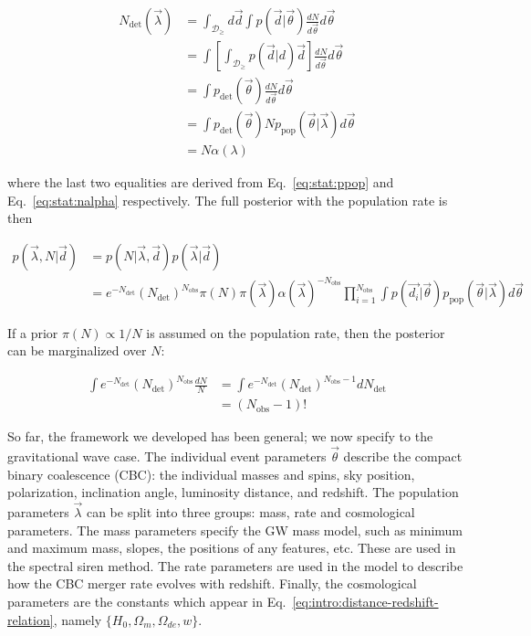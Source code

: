 \documentclass[%
preprint,
 amsmath,amssymb,
 aps,
]{revtex4-2}
\newcommand{\given}[2]{p( #1 | #2 )}
\newcommand{\ppop}[0]{p_{\text{pop}}}
\newcommand{\pdet}[0]{p_{\text{det}}}
\newcommand{\ndet}[0]{N_{\text{det}}}
\newcommand{\nobs}[0]{N_{\text{obs}}}
\begin{document}
\begin{align}
	\ndet(\vec{\lambda}) & = \int_{\mathcal{D}_\geq}  d\vec{d} \int \given{\vec{d}}{\vec{\theta}} \frac{dN}{d\vec{\theta}} d\vec{\theta} \\
	                     & = \int \left[ \int_{\mathcal{D}_\geq} \given{\vec{d}} d\vec{d} \right]\frac{dN}{d\vec{\theta}} d\vec{\theta}  \\
	                     & = \int \pdet(\vec{\theta})\frac{dN}{d\vec{\theta}} d\vec{\theta}                                              \\
	                     & = \int \pdet(\vec{\theta}) N \ppop(\vec{\theta} | \vec{\lambda}) d\vec{\theta}                                \\
	                     & = N \alpha(\lambda)
\end{align}

where the last two equalities are derived from Eq.~\eqref{eq:stat:ppop} and
Eq.~\eqref{eq:stat:nalpha} respectively. The full posterior with the population rate is then

\begin{align}
	\given{\vec{\lambda}, N }{\vec{d}} & = \given{N}{\vec{\lambda}, \vec{d}}\given{\vec{\lambda}}{\vec{d}}                    \\
	                                   & = e^{-\ndet}(\ndet)^{\nobs} \pi(N) \pi(\vec{\lambda}) \alpha(\vec{\lambda})^{-\nobs}
	\prod_{i=1}^{\nobs} \int \given{\vec{d_i}}{\vec{\theta}} \ppop(\vec{\theta} | \vec{\lambda} ) d\vec{\theta}
\end{align}

If a prior $\pi(N) \propto 1/N$ is assumed on the population rate, then the posterior can be
marginalized over $N$:

\begin{align}
	\int e^{-\ndet}(\ndet)^{\nobs} \frac{dN}{N} & = \int e^{-\ndet}(\ndet)^{\nobs - 1} d\ndet \\
	                                            & = (\nobs - 1)!
\end{align}

So far, the framework we developed has been general; we now specify to the gravitational wave case.
The individual event parameters $\vec{\theta}$ describe the compact binary coalescence (CBC): the
individual masses and spins, sky position, polarization, inclination angle, luminosity distance,
and redshift. The population parameters $\vec{\lambda}$ can be split into three groups: mass, rate
and cosmological parameters. The mass parameters specify the GW mass model, such as minimum and
maximum mass, slopes, the positions of any features, etc. These are used in the spectral siren
method. The rate parameters are used in the model to describe how the CBC merger rate evolves with
redshift. Finally, the cosmological parameters are the constants which appear in
Eq.~\eqref{eq:intro:distance-redshift-relation}, namely $\{H_0, \Omega_m, \Omega_{de}, w\}$.
\end{document}
